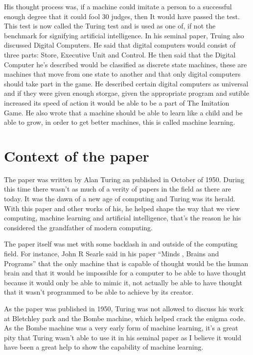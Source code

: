 \documentclass{article}
\begin{document}
His thought process was, if a machine could imitate a person to a successful enough degree that it could fool 30%
judges, then It would have passed the test. This test is now called the Turing test and is used as one of, if not the 
benchmark for signifying artificial intelligence. In his seminal paper, Truing also discussed Digital Computers. He 
said that digital computers would consist of three parts: Store, Executive Unit and Control. He then said that the 
Digital Computer he’s described would be classified as discrete state machines, these are machines that move from one 
state to another and that only digital computers should take part in the game. He described certain digital computers as 
universal and if they were given enough storgae, given the appropriate program and sutible increased its speed of action it 
would be able to be a part of The Imitation Game. He also wrote that a machine should be able to learn like a child and be 
able to grow, in order to get better machines, this is called machine learning.

\section{Context of the paper}

The paper was written by Alan Turing an published in October of 1950. During this time there wasn’t as much of a verity of 
papers in the field as there are today. It was the dawn of a new age of computing and Turing was its herald. With this paper 
and other works of his, he helped shape the way that we view computing, machine learning and artificial intelligence, that’s 
the reason he his considered the grandfather of modern computing. 

The paper itself was met with some backlash in and outside of the computing field. For instance, John R Searle said in his 
paper “Minds , Brains and Programs” that the only machine that is capable of thought would be the human brain and that it 
would be impossible for a computer to be able to have thought because it would only be able to mimic it, not actually be able 
to have thought that it wasn’t programmed to be able to achieve by its creator.

As the paper was published in 1950, Turing was not allowed to discuss his work at Bletchley park and the Bombe machine, which 
helped crack the enigma code. As the Bombe machine was a very early form of machine learning, it’s a great pity that Turing 
wasn’t able to use it in his seminal paper as I believe it would have been a great help to show the capability of machine 
learning. 
\end{document}
